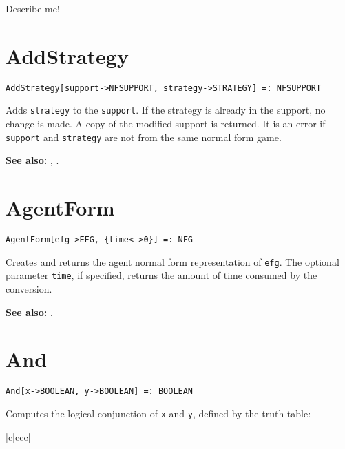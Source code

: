 Describe me!


\section*{AddStrategy}\label{PrimAddStrategy}
\begin{verbatim}
AddStrategy[support->NFSUPPORT, strategy->STRATEGY] =: NFSUPPORT 
\end{verbatim}

Adds \verb+strategy+ to the \verb+support+.  If the strategy is already
in the support, no change is made.  A copy of the modified support is
returned.  It is an error if \verb+support+ and \verb+strategy+ are not
from the same normal form game.

\textbf{See also:}
,
.


\section*{AgentForm}\label{PrimAgentForm}
\begin{verbatim}
AgentForm[efg->EFG, {time<->0}] =: NFG 
\end{verbatim}

Creates and returns the agent normal form representation of \verb+efg+.
The optional parameter \verb+time+, if specified, returns the amount
of time consumed by the conversion.

\textbf{See also:} .


\section*{And}\label{PrimAnd}
\begin{verbatim}
And[x->BOOLEAN, y->BOOLEAN] =: BOOLEAN 
\end{verbatim}

Computes the logical conjunction of \verb+x+ and \verb+y+, defined by the
truth table:

\begin{center}
\begin{tabular}{|c|ccc|} \hline
{}
\end{tabular}
\end{center}

